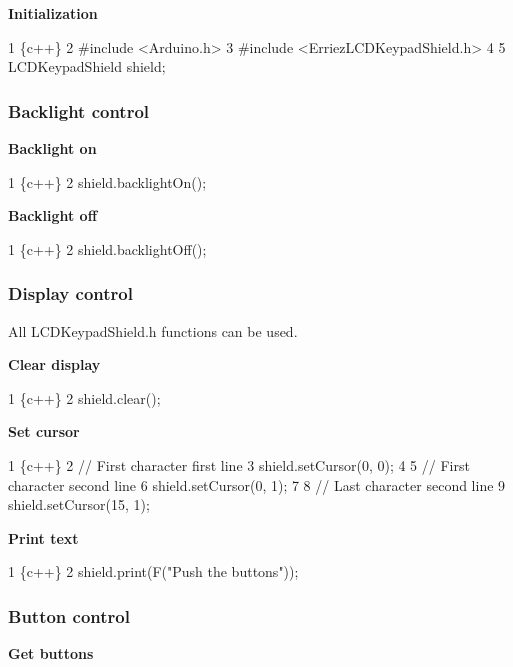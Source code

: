 {\bfseries Initialization}


\begin{DoxyCode}
1 \{c++\}
2 #include <Arduino.h>
3 #include <ErriezLCDKeypadShield.h>
4 
5 LCDKeypadShield shield;
\end{DoxyCode}


\subsubsection*{Backlight control}

{\bfseries Backlight on}


\begin{DoxyCode}
1 \{c++\}
2 shield.backlightOn();
\end{DoxyCode}


{\bfseries Backlight off}


\begin{DoxyCode}
1 \{c++\}
2 shield.backlightOff();
\end{DoxyCode}


\subsubsection*{Display control}

All {\ttfamily L\+C\+D\+Keypad\+Shield.\+h} functions can be used.

{\bfseries Clear display}


\begin{DoxyCode}
1 \{c++\}
2 shield.clear();
\end{DoxyCode}


{\bfseries Set cursor}


\begin{DoxyCode}
1 \{c++\}
2 // First character first line
3 shield.setCursor(0, 0);
4 
5 // First character second line
6 shield.setCursor(0, 1);
7 
8 // Last character second line
9 shield.setCursor(15, 1);
\end{DoxyCode}


{\bfseries Print text}


\begin{DoxyCode}
1 \{c++\}
2 shield.print(F("Push the buttons"));
\end{DoxyCode}


\subsubsection*{Button control}

{\bfseries Get buttons}


